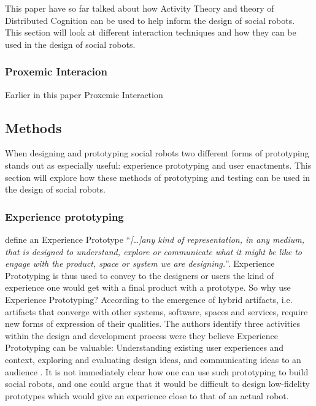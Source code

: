 This paper have so far talked about how Activity Theory and theory of Distributed Cognition can be used to help inform the design of social robots. This section will look at different interaction techniques and how they can be used in the design of social robots.

\subsubsection{Proxemic Interacion}

Earlier in this paper Proxemic Interaction



\subsection{Methods}

When designing and prototyping social robots two different forms of prototyping stands out as especially useful: experience prototyping and user enactments. This section will explore how these methods of prototyping and testing can be used in the design of social robots.

\subsubsection{Experience prototyping}

\textcite[][425]{Buchenau:2000:EP:347642.347802} define an Experience Prototype ``\textit{[\dots]any kind of representation, in any medium, that is designed to understand, explore or communicate what it might be like to engage with the product, space or system we are designing.}''. Experience Prototyping is thus used to convey to the designers or users the kind of experience one would get with a final product with a prototype. So why use Experience Prototyping? According to \textcite{Buchenau:2000:EP:347642.347802} the emergence of hybrid artifacts, i.e. artifacts that converge with other systems, software, spaces and services, require new forms of expression of their qualities. The authors identify three activities within the design and development process were they believe Experience Prototyping can be valuable: Understanding existing user experiences and context, exploring and evaluating design ideas, and communicating ideas to an audience \parencite{Buchenau:2000:EP:347642.347802}. It is not immediately clear how one can use such prototyping to build social robots, and one could argue that it would be difficult to design low-fidelity prototypes which would give an experience close to that of an actual robot.

